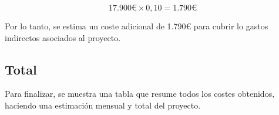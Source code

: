 \[ 17.900€ \times 0,10 = 1.790€ \]

Por lo tanto, se estima un coste adicional de 1.790€ para cubrir lo gastos indirectos asociados al proyecto.

\subsection{Total}

Para finalizar, se muestra una tabla que resume todos los costes obtenidos, haciendo una estimación mensual y total del proyecto.
\begin{table}[H]
    \centering
    \caption{Total de costes del proyecto}
    \label{tab:resumen-costes}
\end{table}
